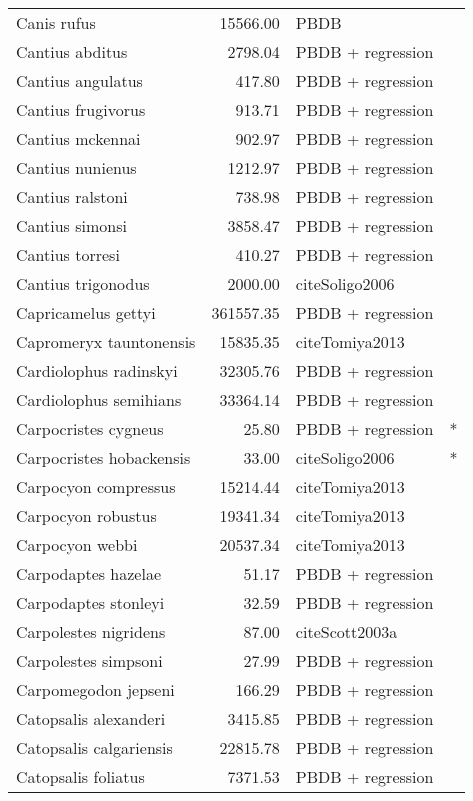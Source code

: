 \begin{table}[ht]
\begin{tabular}{lrll}
  Canis rufus & 15566.00 & PBDB &  \\ 
  Cantius abditus & 2798.04 & PBDB + regression &  \\ 
  Cantius angulatus & 417.80 & PBDB + regression &  \\ 
  Cantius frugivorus & 913.71 & PBDB + regression &  \\ 
  Cantius mckennai & 902.97 & PBDB + regression &  \\ 
  Cantius nunienus & 1212.97 & PBDB + regression &  \\ 
  Cantius ralstoni & 738.98 & PBDB + regression &  \\ 
  Cantius simonsi & 3858.47 & PBDB + regression &  \\ 
  Cantius torresi & 410.27 & PBDB + regression &  \\ 
  Cantius trigonodus & 2000.00 & cite{Soligo2006} &  \\ 
  Capricamelus gettyi & 361557.35 & PBDB + regression &  \\ 
  Capromeryx tauntonensis & 15835.35 & cite{Tomiya2013} &  \\ 
  Cardiolophus radinskyi & 32305.76 & PBDB + regression &  \\ 
  Cardiolophus semihians & 33364.14 & PBDB + regression &  \\ 
  Carpocristes cygneus & 25.80 & PBDB + regression & * \\ 
  Carpocristes hobackensis & 33.00 & cite{Soligo2006} & * \\ 
  Carpocyon compressus & 15214.44 & cite{Tomiya2013} &  \\ 
  Carpocyon robustus & 19341.34 & cite{Tomiya2013} &  \\ 
  Carpocyon webbi & 20537.34 & cite{Tomiya2013} &  \\ 
  Carpodaptes hazelae & 51.17 & PBDB + regression &  \\ 
  Carpodaptes stonleyi & 32.59 & PBDB + regression &  \\ 
  Carpolestes nigridens & 87.00 & cite{Scott2003a} &  \\ 
  Carpolestes simpsoni & 27.99 & PBDB + regression &  \\ 
  Carpomegodon jepseni & 166.29 & PBDB + regression &  \\ 
  Catopsalis alexanderi & 3415.85 & PBDB + regression &  \\ 
  Catopsalis calgariensis & 22815.78 & PBDB + regression &  \\ 
  Catopsalis foliatus & 7371.53 & PBDB + regression &  \\ 

\end{tabular}
\end{table}
